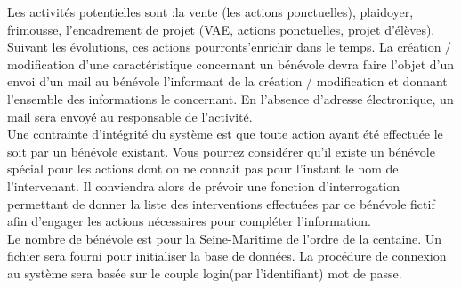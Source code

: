 Les activités potentielles sont :la vente (les actions ponctuelles), plaidoyer, frimousse, l'encadrement de projet (VAE, actions ponctuelles, projet d'élèves). Suivant les évolutions, ces actions pourronts'enrichir dans le temps. 
La création / modification d'une caractéristique concernant un bénévole devra faire l'objet d'un envoi d'un mail au bénévole l'informant de la création / modification et donnant l'ensemble des informations le concernant. En l'absence d'adresse électronique, un mail sera envoyé au responsable de l'activité.\\
Une contrainte d'intégrité du système est que toute action ayant été effectuée le soit par un bénévole existant. 
Vous pourrez considérer qu'il existe un bénévole spécial pour les actions dont on ne connait pas pour l'instant le nom de l'intervenant. Il conviendra alors de prévoir une fonction d'interrogation permettant de donner la liste des interventions effectuées par ce bénévole fictif afin d'engager les actions nécessaires pour compléter l'information.
\\
Le nombre de bénévole est pour la Seine-Maritime de l'ordre de la centaine. Un fichier sera fourni pour initialiser la base de données. 
La procédure de connexion au système sera basée sur le couple login(par l'identifiant) mot de passe.
\\

